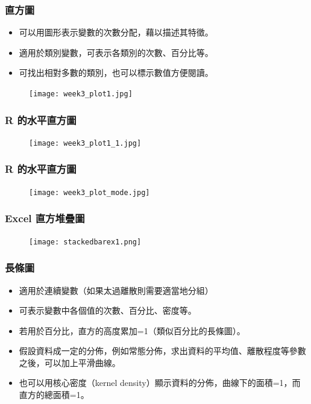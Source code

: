 \documentclass{beamer}
\begin{document}
\begin{frame} \frametitle{直方圖}
\begin{itemize}
\item 可以用圖形表示變數的次數分配，藉以描述其特徵。
\item 適用於類別變數，可表示各類別的次數、百分比等。
\item 可找出相對多數的類別，也可以標示數值方便閱讀。
\end{itemize}
\end{frame}
\begin{frame}
\begin{figure}
\begin{center}
\texttt{[image: week3\_plot1.jpg]}
\end{center}
\end{figure}
\end{frame}
\begin{frame}\frametitle{R 的水平直方圖}
\begin{figure}
\begin{center}
\texttt{[image: week3\_plot1\_1.jpg]}
\end{center}
\end{figure}
\end{frame}
\begin{frame}\frametitle{R 的水平直方圖}
\begin{figure}
\begin{center}
\texttt{[image: week3\_plot\_mode.jpg]}
\end{center}
\end{figure}
\end{frame}
\begin{frame}\frametitle{Excel 直方堆疊圖}
\begin{figure}
\begin{center}
\texttt{[image: stackedbarex1.png]}
\end{center}
\end{figure}
\end{frame}
\begin{frame} \frametitle{長條圖}
\begin{itemize}
\item 適用於連續變數（如果太過離散則需要適當地分組）
\item 可表示變數中各個值的次數、百分比、密度等。
\item 若用於百分比，直方的高度累加=1（類似百分比的長條圖）。
\item 假設資料成一定的分佈，例如常態分佈，求出資料的平均值、離散程度等參數之後，可以加上平滑曲線。
\item 也可以用核心密度（kernel density）顯示資料的分佈，曲線下的面積=1，而直方的總面積=1。
\end{itemize}
\end{frame}
\end{document}
